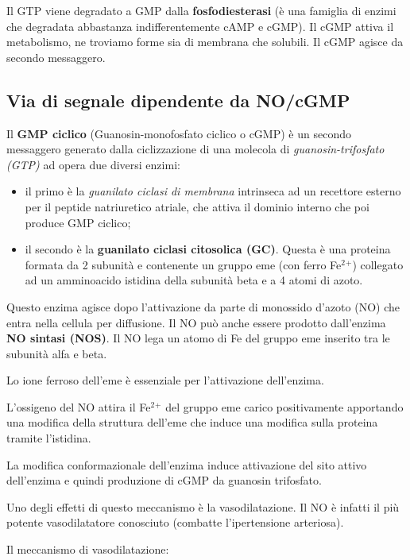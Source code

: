 \documentclass[]{article}
\begin{document}
Il GTP viene degradato a GMP dalla \textbf{fosfodiesterasi} (è una
famiglia di enzimi che degradata abbastanza indifferentemente cAMP e
cGMP). Il cGMP attiva il metabolismo, ne troviamo forme sia di membrana
che solubili. Il cGMP agisce da secondo messaggero.

\subsection{Via di segnale dipendente da
NO/cGMP}\label{via-di-segnale-dipendente-da-nocgmp}

Il \textbf{GMP ciclico} (Guanosin-monofosfato ciclico o cGMP) è un
secondo messaggero generato dalla ciclizzazione di una molecola di
\emph{guanosin-trifosfato (GTP)} ad opera due diversi enzimi:

\begin{itemize}
\itemsep1pt\parskip0pt
\item
  il primo è la \emph{guanilato ciclasi di membrana} intrinseca ad un
  recettore esterno per il peptide natriuretico atriale, che attiva il
  dominio interno che poi produce GMP ciclico;
\item
  il secondo è la \textbf{guanilato ciclasi citosolica (GC)}. Questa è
  una proteina formata da 2 subunità e contenente un gruppo eme (con
  ferro Fe\(^2\)\(^+\)) collegato ad un amminoacido istidina della
  subunità beta e a 4 atomi di azoto.
\end{itemize}

Questo enzima agisce dopo l'attivazione da parte di monossido d'azoto
(NO) che entra nella cellula per diffusione. Il NO può anche essere
prodotto dall'enzima \textbf{NO sintasi (NOS)}. Il NO lega un atomo di
Fe del gruppo eme inserito tra le subunità alfa e beta.

Lo ione ferroso dell'eme è essenziale per l'attivazione dell'enzima.

L'ossigeno del NO attira il Fe\(^2\)\(^+\) del gruppo eme carico
positivamente apportando una modifica della struttura dell'eme che
induce una modifica sulla proteina tramite l'istidina.

La modifica conformazionale dell'enzima induce attivazione del sito
attivo dell'enzima e quindi produzione di cGMP da guanosin trifosfato.

Uno degli effetti di questo meccanismo è la vasodilatazione. Il NO è
infatti il più potente vasodilatatore conosciuto (combatte
l'ipertensione arteriosa).

Il meccanismo di vasodilatazione:
\end{document}
